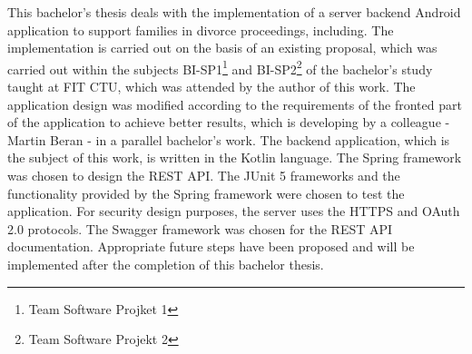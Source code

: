 This bachelor's thesis deals with the implementation of a server backend Android application to support families in divorce proceedings, including. The implementation is carried out on the basis of an existing proposal, which was carried out within the subjects BI-SP1\footnote{Team Software Projket 1} and BI-SP2\footnote{Team Software Projekt 2} of the bachelor's study taught at FIT CTU, which was attended by the author of this work. The application design was modified according to the requirements of the fronted part of the application to achieve better results, which is developing by a colleague - Martin Beran - in a parallel bachelor's work. The backend application, which is the subject of this work, is written in the Kotlin language. The Spring framework was chosen to design the REST API. The JUnit 5 frameworks and the functionality provided by the Spring framework were chosen to test the application. For security design purposes, the server uses the HTTPS and OAuth 2.0 protocols. The Swagger framework was chosen for the REST API documentation. Appropriate future steps have been proposed and will be implemented after the completion of this bachelor thesis.